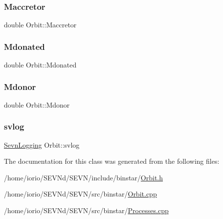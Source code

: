 \subsubsection{\texorpdfstring{Maccretor}{Maccretor}}
{\footnotesize\ttfamily double Orbit\+::\+Maccretor\hspace{0.3cm}{\ttfamily [protected]}}

\mbox{\label{class_orbit_a7ea0a5a0e3b8c3d88409d000326da464}} 
\subsubsection{\texorpdfstring{Mdonated}{Mdonated}}
{\footnotesize\ttfamily double Orbit\+::\+Mdonated\hspace{0.3cm}{\ttfamily [protected]}}

\mbox{\label{class_orbit_ae629e67aa33a7a8cb1c06337a725edcc}} 
\subsubsection{\texorpdfstring{Mdonor}{Mdonor}}
{\footnotesize\ttfamily double Orbit\+::\+Mdonor\hspace{0.3cm}{\ttfamily [protected]}}

\mbox{\label{class_orbit_a94df5f96ea2e36d103890a07c1ae37cd}} 
\subsubsection{\texorpdfstring{svlog}{svlog}}
{\footnotesize\ttfamily \hyperlink{classsevnstd_1_1_sevn_logging}{Sevn\+Logging} Orbit\+::svlog}



The documentation for this class was generated from the following files\+:\begin{DoxyCompactItemize}
\item 
/home/iorio/\+S\+E\+V\+Nd/\+S\+E\+V\+N/include/binstar/\hyperlink{_orbit_8h}{Orbit.\+h}\item 
/home/iorio/\+S\+E\+V\+Nd/\+S\+E\+V\+N/src/binstar/\hyperlink{_orbit_8cpp}{Orbit.\+cpp}\item 
/home/iorio/\+S\+E\+V\+Nd/\+S\+E\+V\+N/src/binstar/\hyperlink{_processes_8cpp}{Processes.\+cpp}\end{DoxyCompactItemize}
